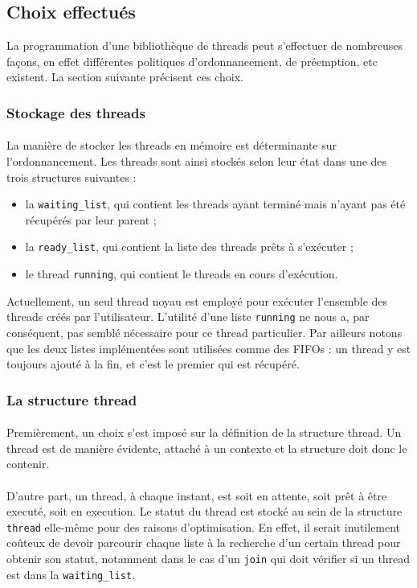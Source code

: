 \subsection{Choix effectués}

La programmation d'une bibliothèque de threads peut s'effectuer de
nombreuses façons, en effet différentes politiques d'ordonnancement,
de préemption, etc existent. La section suivante précisent ces choix.

\subsubsection{Stockage des threads}

\paragraph{} La manière de stocker les threads en mémoire est
déterminante sur l'ordonnancement. Les threads sont ainsi stockés
selon leur état dans une des trois structures suivantes :
\begin{itemize}
\item la \texttt{waiting\_list}, qui contient les threads ayant
terminé mais n'ayant pas été récupérés par leur parent ;
\item la \texttt{ready\_list}, qui contient la liste des threads prêts
à s'exécuter ;
\item le thread \texttt{running}, qui contient le threads en cours
d'exécution.
\end{itemize} Actuellement, un seul thread noyau est employé pour
exécuter l'ensemble des threads créés par l'utilisateur. L'utilité
d'une liste \texttt{running} ne nous a, par conséquent, pas semblé
nécessaire pour ce thread particulier. Par ailleurs notons que les
deux listes implémentées sont utilisées comme des FIFOs : un thread y
est toujours ajouté à la fin, et c'est le premier qui est récupéré.

\subsubsection{La structure thread}

\paragraph{} Premièrement, un choix s'est imposé sur la définition de
la structure thread. Un thread est de manière évidente, attaché à un
contexte et la structure doit donc le contenir.
\paragraph{} D'autre part, un thread, à chaque instant, est soit en
attente, soit prêt à être executé, soit en execution. Le statut du
thread est stocké au sein de la structure \texttt{thread} elle-même
pour des raisons d'optimisation. En effet, il serait inutilement
coûteux de devoir parcourir chaque liste à la recherche d'un certain
thread pour obtenir son statut, notamment dans le cas d'un
\texttt{join} qui doit vérifier si un thread est dans la
\texttt{waiting\_list}.
